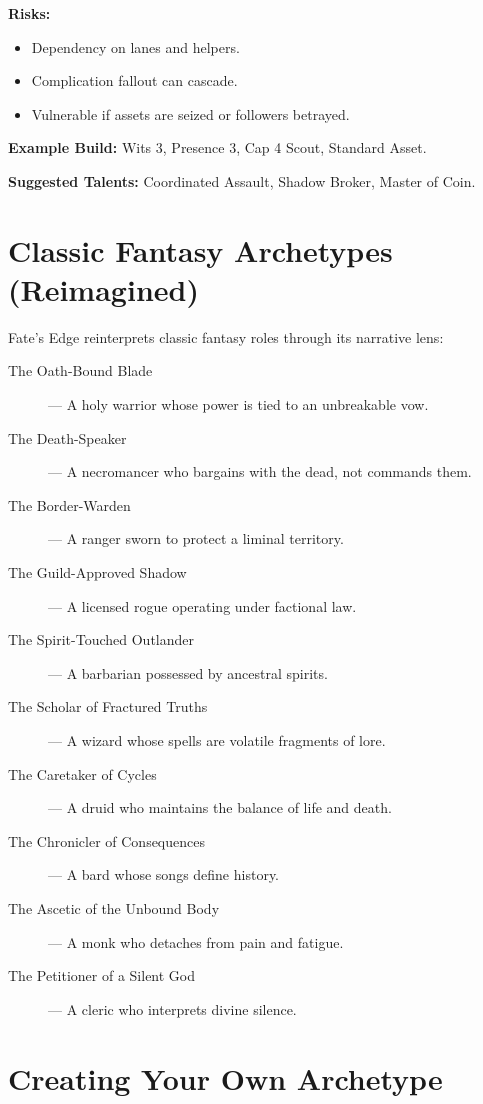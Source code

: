 \textbf{Risks:}
\begin{itemize}
  \item Dependency on lanes and helpers.
  \item Complication fallout can cascade.
  \item Vulnerable if assets are seized or followers betrayed.
\end{itemize}

\textbf{Example Build:} Wits 3, Presence 3, Cap 4 Scout, Standard Asset.

\textbf{Suggested Talents:} Coordinated Assault, Shadow Broker, Master of Coin.

\section{Classic Fantasy Archetypes (Reimagined)}

Fate’s Edge reinterprets classic fantasy roles through its narrative lens:

\begin{description}
  \item[The Oath-Bound Blade] — A holy warrior whose power is tied to an unbreakable vow.
  \item[The Death-Speaker] — A necromancer who bargains with the dead, not commands them.
  \item[The Border-Warden] — A ranger sworn to protect a liminal territory.
  \item[The Guild-Approved Shadow] — A licensed rogue operating under factional law.
  \item[The Spirit-Touched Outlander] — A barbarian possessed by ancestral spirits.
  \item[The Scholar of Fractured Truths] — A wizard whose spells are volatile fragments of lore.
  \item[The Caretaker of Cycles] — A druid who maintains the balance of life and death.
  \item[The Chronicler of Consequences] — A bard whose songs define history.
  \item[The Ascetic of the Unbound Body] — A monk who detaches from pain and fatigue.
  \item[The Petitioner of a Silent God] — A cleric who interprets divine silence.
\end{description}

\section{Creating Your Own Archetype}

